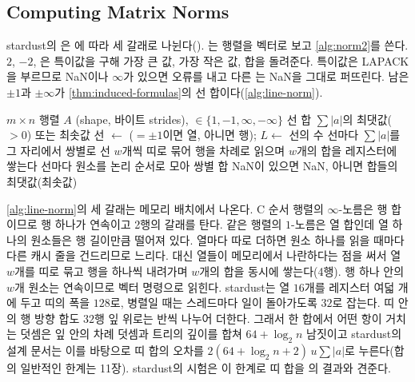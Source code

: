 \subsection{Computing Matrix Norms}

stardust의 은 에 따라 세 갈래로 나뉜다(). 는 행렬을 벡터로 보고 \cref{alg:norm2}를 쓴다. $2$, $-2$, 은 특이값을 구해 가장 큰 값, 가장 작은 값, 합을 돌려준다. 특이값은 LAPACK을 부르므로 NaN이나 $\infty$가 있으면 오류를 내고 다른 는 NaN을 그대로 퍼뜨린다. 남은 $\pm1$과 $\pm\infty$가 \cref{thm:induced-formulas}의 선 합이다(\cref{alg:line-norm}).

\begin{algorithm}[htbp]
\begin{algorithmic}[1]
\Require $m\times n$ 행렬 $A$ (shape, 바이트 strides), $\in\{1,-1,\infty,-\infty\}$
\Ensure 선 합 $\sum|a|$의 최댓값($>0$) 또는 최솟값
\State 선 $\gets$ ($=\pm1$이면 열, 아니면 행); $L\gets$ 선의 수 
  \State 선마다 $\sum|a|$를 그 자리에서 쌍별로 
  \State 선 $w$개씩 띠로 묶어 행을 차례로 읽으며 $w$개의 합을 레지스터에 쌓는다 
\Else
  \State 선마다 원소를 논리 순서로 모아 쌍별 합
\EndIf
\State \Return NaN이 있으면 NaN, 아니면 합들의 최댓값(최솟값)
\end{algorithmic}
\caption{$\pm1$, $\pm\infty$ 노름의 선 합 (stardust )}
\label{alg:line-norm}
\end{algorithm}

\cref{alg:line-norm}의 세 갈래는 메모리 배치에서 나온다. C 순서 행렬의 $\infty$-노름은 행 합이므로 행 하나가 연속이고 2행의 갈래를 탄다. 같은 행렬의 $1$-노름은 열 합인데 열 하나의 원소들은 행 길이만큼 떨어져 있다. 열마다 따로 더하면 원소 하나를 읽을 때마다 다른 캐시 줄을 건드리므로 느리다. 대신 열들이 메모리에서 나란하다는 점을 써서 열 $w$개를 띠로 묶고 행을 하나씩 내려가며 $w$개의 합을 동시에 쌓는다(4행). 행 하나 안의 $w$개 원소는 연속이므로 벡터 명령으로 읽힌다. stardust는 열 $16$개를 레지스터 여덟 개에 두고 띠의 폭을 $128$로, 병렬일 때는 스레드마다 일이 돌아가도록 $32$로 잡는다. 띠 안의 행 방향 합도 $32$행 잎 위로는 반씩 나누어 더한다. 그래서 한 합에서 어떤 항이 거치는 덧셈은 잎 안의 차례 덧셈과 트리의 깊이를 합쳐 $64+\log_2n$ 남짓이고 stardust의 설계 문서는 이를 바탕으로 띠 합의 오차를 $2(64+\log_2n+2)\,u\sum|a|$로 누른다(합의 일반적인 한계는 11장). stardust의 시험은 이 한계로 띠 합을 의 결과와 견준다.

